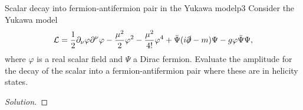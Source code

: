\begin{problem}{Scalar decay into fermion-antifermion pair in the Yukawa model}{p3}
   Consider the Yukawa model
   \begin{equation*}
      \mathcal{L} = \frac12 \partial_\nu \varphi \partial^\nu \varphi - \frac{\mu^2}{2} \varphi^2 - \frac{\mu^2}{4!} \varphi^4 + \bar{\Psi} (i \slashed{\partial} - m) \Psi - g \varphi \bar{\Psi} \Psi,
   \end{equation*}
   where \(\varphi\) is a real scalar field and \(\Psi\) a Dirac fermion. Evaluate the amplitude for the decay of the scalar into a fermion-antifermion pair where these are in helicity states.
\end{problem}
\begin{proof}[Solution]
    
\end{proof}
